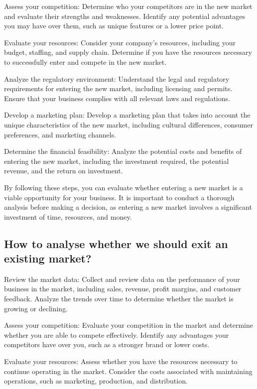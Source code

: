\documentclass[12pt, a4paper, oneside]{article}
\begin{document}
Assess your competition: Determine who your competitors are in the new market and evaluate their strengths and weaknesses. Identify any potential advantages you may have over them, such as unique features or a lower price point.

Evaluate your resources: Consider your company's resources, including your budget, staffing, and supply chain. Determine if you have the resources necessary to successfully enter and compete in the new market.

Analyze the regulatory environment: Understand the legal and regulatory requirements for entering the new market, including licensing and permits. Ensure that your business complies with all relevant laws and regulations.

Develop a marketing plan: Develop a marketing plan that takes into account the unique characteristics of the new market, including cultural differences, consumer preferences, and marketing channels.

Determine the financial feasibility: Analyze the potential costs and benefits of entering the new market, including the investment required, the potential revenue, and the return on investment.

By following these steps, you can evaluate whether entering a new market is a viable opportunity for your business. It is important to conduct a thorough analysis before making a decision, as entering a new market involves a significant investment of time, resources, and money.





\subsection{ How to analyse whether we should exit an existing market? }
Review the market data: Collect and review data on the performance of your business in the market, including sales, revenue, profit margins, and customer feedback. Analyze the trends over time to determine whether the market is growing or declining.

Assess your competition: Evaluate your competition in the market and determine whether you are able to compete effectively. Identify any advantages your competitors have over you, such as a stronger brand or lower costs.

Evaluate your resources: Assess whether you have the resources necessary to continue operating in the market. Consider the costs associated with maintaining operations, such as marketing, production, and distribution.
\end{document}
